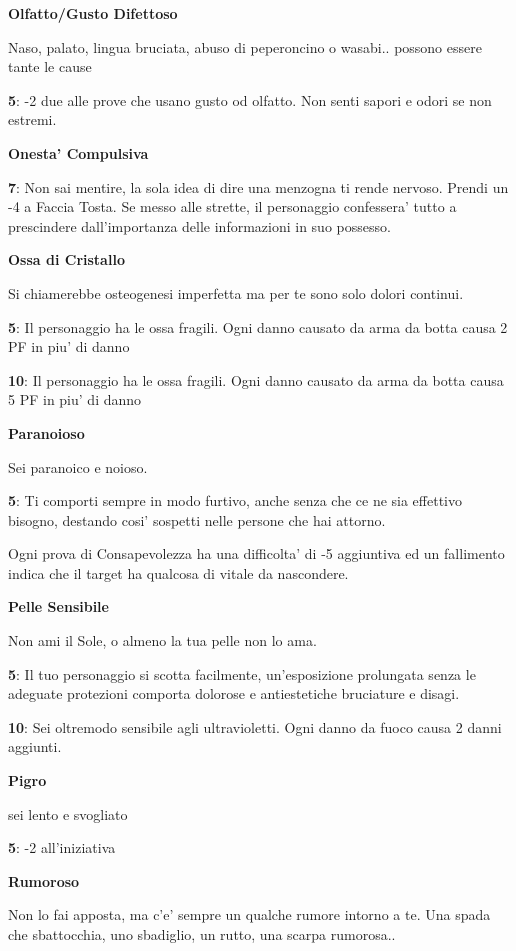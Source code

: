 \documentclass[a4paper,11pt,twoside,openany]{dndbook}
\begin{document}
{\textbf{Olfatto/Gusto Difettoso}

Naso, palato, lingua bruciata, abuso di peperoncino o wasabi.. possono essere tante le cause

\textbf{5}: -2 due alle prove che usano gusto od olfatto. Non senti sapori e odori se non estremi.

\textbf{Onesta' Compulsiva}

\textbf{7}: Non sai mentire, la sola idea di dire una menzogna ti rende nervoso. Prendi un -4 a Faccia Tosta. Se messo alle strette, il personaggio confessera' tutto a prescindere dall'importanza delle informazioni in suo possesso.

\textbf{Ossa di Cristallo}

Si chiamerebbe osteogenesi imperfetta ma per te sono solo dolori continui.

\textbf{5}: Il personaggio ha le ossa fragili. Ogni danno causato da arma da botta causa 2 PF in piu' di danno

\textbf{10}: Il personaggio ha le ossa fragili. Ogni danno causato da arma da botta causa 5 PF in piu' di danno

\textbf{Paranoioso}

Sei paranoico e noioso.

\textbf{5}: Ti comporti sempre in modo furtivo, anche senza che ce ne sia effettivo bisogno, destando cosi' sospetti nelle persone che hai attorno.

Ogni prova di Consapevolezza ha una difficolta' di -5 aggiuntiva ed un fallimento indica che il target ha qualcosa di vitale da nascondere.

\textbf{Pelle Sensibile}

Non ami il Sole, o almeno la tua pelle non lo ama.

\textbf{5}: Il tuo personaggio si scotta facilmente, un'esposizione prolungata senza le adeguate protezioni comporta dolorose e antiestetiche bruciature e disagi.

\textbf{10}: Sei oltremodo sensibile agli ultravioletti. Ogni danno da fuoco causa 2 danni aggiunti.

\textbf{Pigro}

sei lento e svogliato

\textbf{5}: -2 all'iniziativa

\textbf{Rumoroso}

Non lo fai apposta, ma c'e' sempre un qualche rumore intorno a te. Una spada che sbattocchia, uno sbadiglio, un rutto, una scarpa rumorosa..

}
\end{document}
